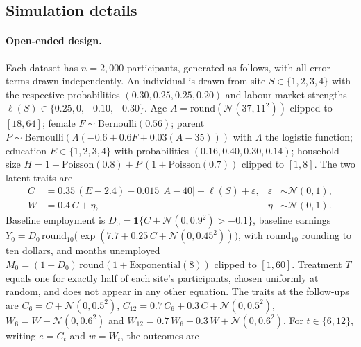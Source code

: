 \documentclass[10pt]{article}
\begin{document}
\subsection{Simulation details}\label{app:simulation_details}

\paragraph{Open-ended design.} Each dataset has $n = 2{,}000$ participants, generated as follows, with all error terms drawn independently. An individual is drawn from site $S \in \{1, 2, 3, 4\}$ with the respective probabilities $(0.30, 0.25, 0.25, 0.20)$ and labour-market strengths $\ell(S) \in \{0.25, 0, -0.10, -0.30\}$. Age $A = \mathrm{round}(\mathcal{N}(37, 11^2))$ clipped to $[18, 64]$; female $F \sim \mathrm{Bernoulli}(0.56)$; parent $P \sim \mathrm{Bernoulli}(\Lambda(-0.6 + 0.6F + 0.03(A - 35)))$ with $\Lambda$ the logistic function; education $E \in \{1, 2, 3, 4\}$ with probabilities $(0.16, 0.40, 0.30, 0.14)$; household size $H = 1 + \mathrm{Poisson}(0.8) + P\,(1 + \mathrm{Poisson}(0.7))$ clipped to $[1, 8]$. The two latent traits are
\begin{align*}
C &= 0.35\,(E - 2.4) - 0.015\,|A - 40| + \ell(S) + \varepsilon, & \varepsilon &\sim \mathcal{N}(0, 1), \\
W &= 0.4\,C + \eta, & \eta &\sim \mathcal{N}(0, 1).
\end{align*}
Baseline employment is $D_0 = \mathbf{1}\{C + \mathcal{N}(0, 0.9^2) > -0.1\}$, baseline earnings $Y_0 = D_0\,\mathrm{round}_{10}\bigl(\exp(7.7 + 0.25\,C + \mathcal{N}(0, 0.45^2))\bigr)$, with $\mathrm{round}_{10}$ rounding to ten dollars, and months unemployed $M_0 = (1 - D_0)\,\mathrm{round}(1 + \mathrm{Exponential}(8))$ clipped to $[1, 60]$. Treatment $T$ equals one for exactly half of each site's participants, chosen uniformly at random, and does not appear in any other equation. The traits at the follow-ups are $C_6 = C + \mathcal{N}(0, 0.5^2)$, $C_{12} = 0.7\,C_6 + 0.3\,C + \mathcal{N}(0, 0.5^2)$, $W_6 = W + \mathcal{N}(0, 0.6^2)$ and $W_{12} = 0.7\,W_6 + 0.3\,W + \mathcal{N}(0, 0.6^2)$. For $t \in \{6, 12\}$, writing $e = C_t$ and $w = W_t$, the outcomes are
\end{document}
